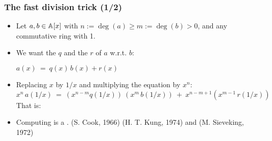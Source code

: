 \begin{frame}
\frametitle{The fast division trick (1/2)}


\begin{itemize}
\item Let $a, b \in {\ensuremath{\mathbb{A}}}[x]$ with $n := {\deg}(a) \geq m := {\deg}(b) > 0$,
 and {\A} any commutative ring with 1.
\medskip
\item<2-> We want the  $q$ 
and the  $r$ of $a$ w.r.t. $b$:
\begin{center}
$a(x) \ = \ q(x) \, b(x) + r(x)$
\end{center}
\medskip
\item<3-> Replacing $x$ by $1/x$ and multiplying the equation by $x^n$:
$$x^n \, a(1/x) \ = \ \left(x^{n-m} q(1/x) \right) \ 
                    \left(x^m \, b(1/x) \right) \ + \ x^{n-m+1} \left( x^{m-1} \,  r(1/x) \right) $$
That is:
\begin{center}
\end{center}
\medskip
\item<4-> Computing 
is a .
(S. Cook, 1966) (H. T.  Kung, 1974) and (M. Sieveking, 1972)
\end{itemize}

\end{frame}
\ifshow
\fi

